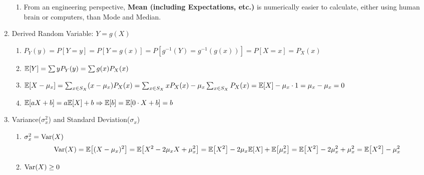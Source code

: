 \begin{enumerate}
{\begin{enumerate}
{\begin{enumerate}
{                        \begin{enumerate}
                            \item Bernoulli(p): $$\E{X}=0\cdot P_X(0)+1\cdot P_X(1)=0(1-p)+1(p)=p$$
                            \item Binomial(n,p): $$\E{X}=np$$
                            \item Poisson($\alpha$): $$\E{X}=\alpha$$
                            \item Geometric(p): $$\E{X}=\sum_{x=1}^{\infty}xP_X(x)=\sum_{x=1}^{\infty}xp(1-p)^{x-1}=\dfrac{p}{1-p}\sum_{x=1}^{\infty}x(1-p)^x=\dfrac{p}{1-p}\dfrac{1-p}{[1-(1-p)]^2}=\dfrac{p}{p^2}=\dfrac{1}{p}$$
                            \item Pascal(k,p): $$\E{X}=k/p$$
                            \item Discrete Uniform(k,l): $$\E{X}=(k+l)/2$$
                        \end{enumerate}
                    }
                \end{enumerate}
            }
            \item From an engineering perspective, \textbf{Mean (including Expectations, etc.)} is numerically easier to calculate, either using human brain or computers, than Mode and Median. 
        \end{enumerate}
    }
    \item Derived Random Variable: $Y = g(X)${
        \begin{enumerate}
            \item $P_Y(y) = P[Y=y] = P[Y=g(x)] = P[g^{-1}(Y)=g^{-1}(g(x))] = P[X=x] = P_X(x)$
            \item $\E{Y} = \sum yP_Y(y) = \sum g(x)P_X(x)$
            \item $\E{X-\mu_x}=\sum_{x\in S_X}(x-\mu_x)P_X(x)=\sum_{x\in S_X}xP_X(x)-\mu_x\sum_{x\in S_X}P_X(x)=\E{X}-\mu_x\cdot 1=\mu_x-\mu_x=0$
            \item $\E{aX+b}=a\E{X}+b \Rightarrow \E{b}=\E{0\cdot X+b}=b$
        \end{enumerate}
    }
    \item Variance($\sigma_x^2$) and Standard Deviation($\sigma_x$){
        \begin{enumerate}
            \item $\sigma_x^2=\mathop{\mathrm{Var}}\nolimits(X)$ $$\Var(X)=\E{(X-\mu_x)^2}=\E{X^2-2\mu_xX+\mu_x^2}=\E{X^2}-2\mu_x\E{X}+\E{\mu_x^2}=\E{X^2}-2\mu_x^2+\mu_x^2=\E{X^2}-\mu_x^2$$
            \item $\mathop{\mathrm{Var}}\nolimits(X)\geq 0$

\end{enumerate}}
\end{enumerate}
